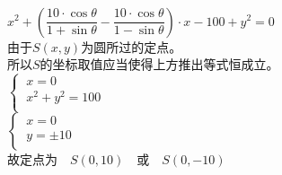 \documentclass[UTF8]{ctexart}
\begin{document}
\begin{multicols}{2}
\begin{align*}
        \end{align*}
        $x^2+\left(\dfrac{10\cdot\cos{\theta}}{1+\sin{\theta}}-\dfrac{10\cdot\cos{\theta}}{1-\sin{\theta}}\right)\cdot x-100+y^2=0$\\[8mm]
        由于$S(x,y)$为圆所过的定点。\\[3mm]
        所以$S$的坐标取值应当使得上方推出等式恒成立。\\[5mm]
        \begin{math}
            \begin{cases}
                ~x=0\\[1mm]
                ~x^2+y^2=100\\[1mm]
            \end{cases}
        \end{math}\\[5mm]
        \begin{math}
            \begin{cases}
                ~x=0\\[1mm]
                ~y=\pm 10\\[1mm]
            \end{cases}
        \end{math}\\[5mm]
        故定点为~~$S(0,10)$~~或~~$S(0,-10)$
        \newpage
    \end{multicols}

\newpage
\end{document}
